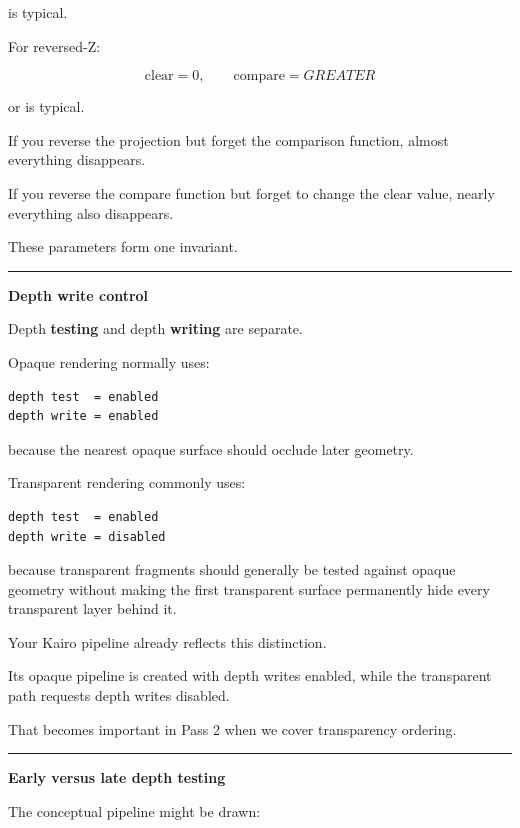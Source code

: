 is typical.

For reversed-Z:

\[
\text{clear}=0,\qquad
\text{compare}=GREATER
\]

or  is typical.

If you reverse the projection but forget the comparison function, almost everything disappears.

If you reverse the compare function but forget to change the clear value, nearly everything also disappears.

These parameters form one invariant.

\begin{center}\rule{0.5\linewidth}{0.5pt}\end{center}

\textbf{Depth write control}

Depth \textbf{testing} and depth \textbf{writing} are separate.

Opaque rendering normally uses:

\begin{verbatim}
depth test  = enabled
depth write = enabled
\end{verbatim}

because the nearest opaque surface should occlude later geometry.

Transparent rendering commonly uses:

\begin{verbatim}
depth test  = enabled
depth write = disabled
\end{verbatim}

because transparent fragments should generally be tested against opaque geometry without making the first transparent surface permanently hide every transparent layer behind it.

Your Kairo pipeline already reflects this distinction.

Its opaque pipeline is created with depth writes enabled, while the transparent path requests depth writes disabled.

That becomes important in Pass 2 when we cover transparency ordering.

\begin{center}\rule{0.5\linewidth}{0.5pt}\end{center}

\textbf{Early versus late depth testing}

The conceptual pipeline might be drawn:

